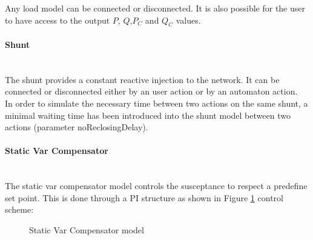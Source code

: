 \documentclass[a4paper, 12pt]{report}
\begin{document}
Any load model can be connected or disconnected. It is also possible for the user to have access to the output $P$, $Q$,$ P_C$ and $Q_C$ values. \\

\paragraph{Shunt}
~~\\

The shunt provides a constant reactive injection to the network. It can be connected or disconnected either by an user action or by an automaton action. \\
In order to simulate the necessary time between two actions on the same shunt, a minimal waiting time has been introduced into the shunt model between two actions (parameter noReclosingDelay). \\

\paragraph{Static Var Compensator}
~~\\

The static var compensator model controls the susceptance to respect a predefine set point. This is done through a PI structure as shown in Figure \ref{StaticVarCompensator} control scheme:

\begin{figure}[h]
  \setlength{\abovecaptionskip}{15pt}
\centering
 \caption{Static Var Compensator model}
 \label{StaticVarCompensator}
\end{figure}
\end{document}

